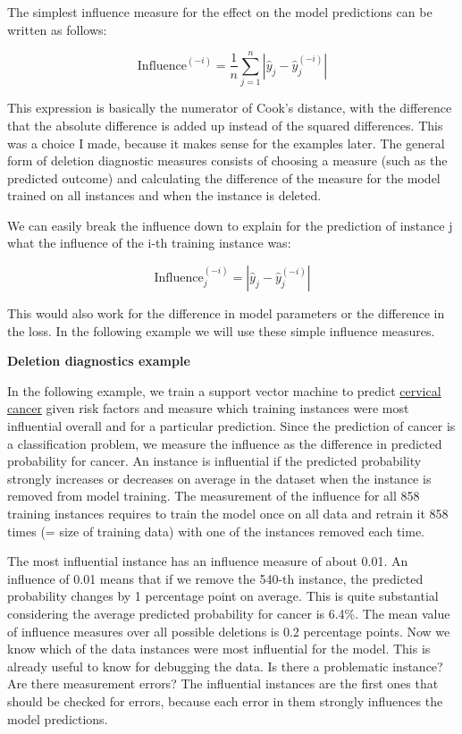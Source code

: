 \documentclass[12pt,]{krantz}
\begin{document}
The simplest influence measure for the effect on the model predictions
can be written as follows:

\[\text{Influence}^{(-i)}=\frac{1}{n}\sum_{j=1}^{n}\left|\hat{y}_j-\hat{y}_{j}^{(-i)}\right|\]

This expression is basically the numerator of Cook's distance, with the
difference that the absolute difference is added up instead of the
squared differences. This was a choice I made, because it makes sense
for the examples later. The general form of deletion diagnostic measures
consists of choosing a measure (such as the predicted outcome) and
calculating the difference of the measure for the model trained on all
instances and when the instance is deleted.

We can easily break the influence down to explain for the prediction of
instance j what the influence of the i-th training instance was:

\[\text{Influence}_{j}^{(-i)}=\left|\hat{y}_j-\hat{y}_{j}^{(-i)}\right|\]

This would also work for the difference in model parameters or the
difference in the loss. In the following example we will use these
simple influence measures.

\textbf{Deletion diagnostics example}

In the following example, we train a support vector machine to predict
\protect\hyperlink{cervical}{cervical cancer} given risk factors and
measure which training instances were most influential overall and for a
particular prediction. Since the prediction of cancer is a
classification problem, we measure the influence as the difference in
predicted probability for cancer. An instance is influential if the
predicted probability strongly increases or decreases on average in the
dataset when the instance is removed from model training. The
measurement of the influence for all 858 training instances requires to
train the model once on all data and retrain it 858 times (= size of
training data) with one of the instances removed each time.

The most influential instance has an influence measure of about 0.01. An
influence of 0.01 means that if we remove the 540-th instance, the
predicted probability changes by 1 percentage point on average. This is
quite substantial considering the average predicted probability for
cancer is 6.4\%. The mean value of influence measures over all possible
deletions is 0.2 percentage points. Now we know which of the data
instances were most influential for the model. This is already useful to
know for debugging the data. Is there a problematic instance? Are there
measurement errors? The influential instances are the first ones that
should be checked for errors, because each error in them strongly
influences the model predictions.
\end{document}
